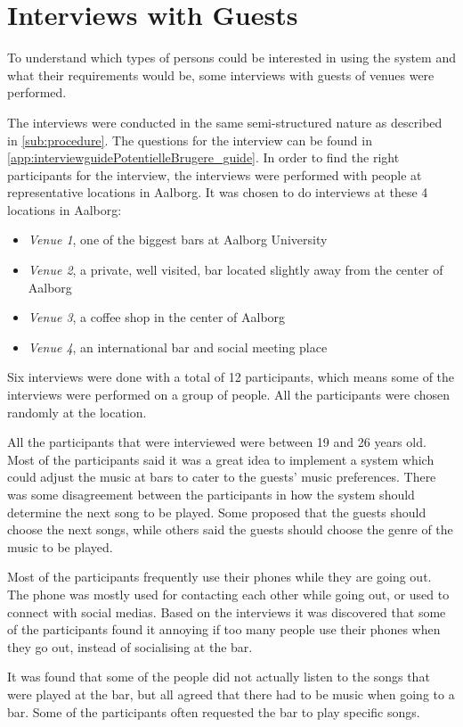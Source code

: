 \section{Interviews with Guests}
\label{userInterviews}

To understand which types of persons could be interested in using the system and what their requirements would be, some interviews with guests of venues were performed.

The interviews were conducted in the same semi-structured nature as described in \cref{sub:procedure}. The questions for the interview can be found in \cref{app:interviewguidePotentielleBrugere_guide}. In order to find the right participants for the interview, the interviews were performed with people at representative locations in Aalborg. It was chosen to do interviews at these 4 locations in Aalborg:

\begin{itemize}
    \item \emph{Venue 1}, one of the biggest bars at Aalborg University
    \item \emph{Venue 2}, a private, well visited, bar located slightly away from the center of Aalborg
    \item \emph{Venue 3}, a coffee shop in the center of Aalborg
    \item \emph{Venue 4}, an international bar and social meeting place
\end{itemize}

Six interviews were done with a total of 12 participants, which means some of the interviews were performed on a group of people. All the participants were chosen randomly at the location.

All the participants that were interviewed were between 19 and 26 years old. Most of the participants said it was a great idea to implement a system which could adjust the music at bars to cater to the guests' music preferences. There was some disagreement between the participants in how the system should determine the next song to be played. Some proposed that the guests should choose the next songs, while others said the guests should choose the genre of the music to be played.

Most of the participants frequently use their phones while they are going out. The phone was mostly used for contacting each other while going out, or used to connect with social medias.
Based on the interviews it was discovered that some of the participants found it annoying if too many people use their phones when they go out, instead of socialising at the bar.

It was found that some of the people did not actually listen to the songs that were played at the bar, but all agreed that there had to be music when going to a bar. Some of the participants often requested the bar to play specific songs.